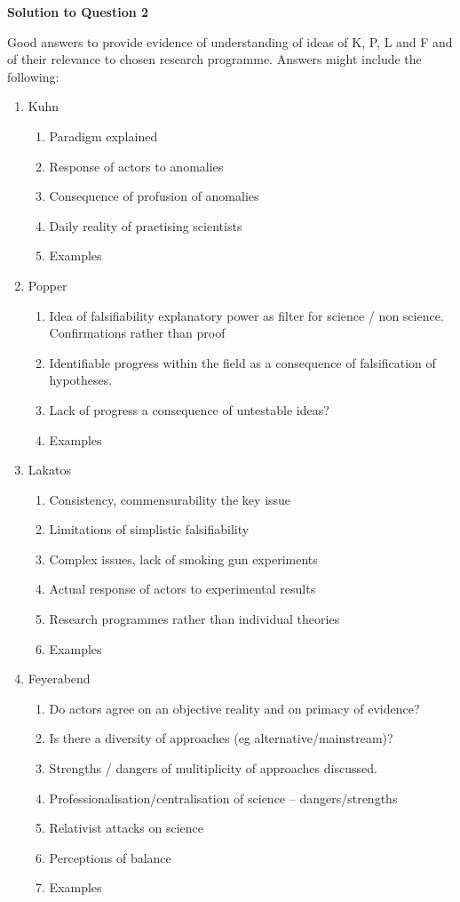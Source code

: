 \documentclass[a4paper,12pt,fleqn]{article}
\begin{document}
\textbf{Solution to Question 2}\newline

Good answers to provide evidence of understanding of ideas of K, P, L and F and of their relevance to chosen research programme. Answers might include the following:

\begin{enumerate}[label=\alph*)]
\item Kuhn
\begin{enumerate}[label=\roman*)]
\item Paradigm explained
\item Response of actors to anomalies
\item Consequence of profusion of anomalies
\item Daily reality of practising scientists
\item Examples
\end{enumerate}

\item Popper
\begin{enumerate}[label=\roman*)]
\item Idea of falsifiability explanatory power as filter for science / non science. Confirmations rather than proof
\item Identifiable progress within the field as a consequence of falsification of hypotheses.
\item  Lack of progress a consequence of untestable ideas? 
\item Examples
\end{enumerate}

\item Lakatos
\begin{enumerate}[label=\roman*)]
\item Consistency, commensurability the key issue
\item Limitations of simplistic falsifiability
\item Complex issues, lack of smoking gun experiments
\item Actual response of actors to experimental results
\item Research programmes rather than individual theories
\item Examples
\end{enumerate}

\item Feyerabend
\begin{enumerate}[label=\roman*)]
\item Do actors agree on an objective reality and on primacy of evidence?
\item Is there a diversity of approaches (eg alternative/mainstream)?
\item Strengths / dangers of mulitiplicity of approaches discussed.
\item Professionalisation/centralisation of science – dangers/strengths
\item Relativist attacks on science
\item Perceptions of balance
\item Examples
\end{enumerate}
\end{enumerate}
\end{document}
